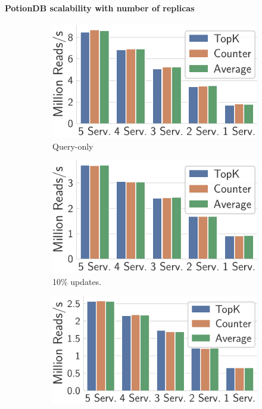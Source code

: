 \documentclass[sigconf, nonacm]{acmart}
\begin{document}
\paragraph{PotionDB scalability with number of replicas}

\begin{figure}
	\centering
	\begin{subfigure}{.325\linewidth}
		\includegraphics[width=1\linewidth]{singleQuery/n_servers_0_upd_5b}
		\caption{Query-only}
		\label{fig:crdts_0_upd}
	\end{subfigure}%
	\begin{subfigure}{.325\linewidth}
		\includegraphics[width=1\linewidth]{singleQuery/n_servers_0_1_upd_5b}
		\caption{10\% updates.}
		\label{fig:crdts_10_upd}
	\end{subfigure}%
	\begin{subfigure}{.34\linewidth}
	\includegraphics[width=1\linewidth]{singleQuery/n_servers_0_25_upd_5b}

\end{subfigure}
\end{figure}
\end{document}
